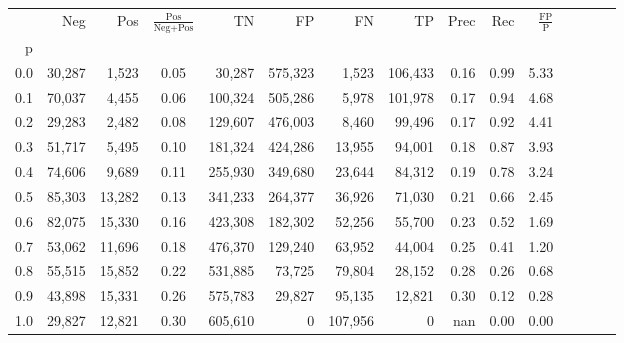 \begin{tabular}{rrrcrrrrrrrrrrr}
\toprule
{} &     Neg &     Pos & $\frac{\text{Pos}}{\text{Neg}+\text{Pos}}$ &       TN &       FP &       FN &       TP &  Prec &   Rec & $\frac{\text{FP}}{\text{P}}$ \\
p   &         &         &                                            &          &          &          &          &       &       &                              \\
\midrule
0.0 &  30,287 &   1,523 &                                       0.05 &   30,287 &  575,323 &    1,523 &  106,433 &  0.16 &  0.99 &                         5.33 \\
0.1 &  70,037 &   4,455 &                                       0.06 &  100,324 &  505,286 &    5,978 &  101,978 &  0.17 &  0.94 &                         4.68 \\
0.2 &  29,283 &   2,482 &                                       0.08 &  129,607 &  476,003 &    8,460 &   99,496 &  0.17 &  0.92 &                         4.41 \\
0.3 &  51,717 &   5,495 &                                       0.10 &  181,324 &  424,286 &   13,955 &   94,001 &  0.18 &  0.87 &                         3.93 \\
0.4 &  74,606 &   9,689 &                                       0.11 &  255,930 &  349,680 &   23,644 &   84,312 &  0.19 &  0.78 &                         3.24 \\
0.5 &  85,303 &  13,282 &                                       0.13 &  341,233 &  264,377 &   36,926 &   71,030 &  0.21 &  0.66 &                         2.45 \\
0.6 &  82,075 &  15,330 &                                       0.16 &  423,308 &  182,302 &   52,256 &   55,700 &  0.23 &  0.52 &                         1.69 \\
0.7 &  53,062 &  11,696 &                                       0.18 &  476,370 &  129,240 &   63,952 &   44,004 &  0.25 &  0.41 &                         1.20 \\
0.8 &  55,515 &  15,852 &                                       0.22 &  531,885 &   73,725 &   79,804 &   28,152 &  0.28 &  0.26 &                         0.68 \\
0.9 &  43,898 &  15,331 &                                       0.26 &  575,783 &   29,827 &   95,135 &   12,821 &  0.30 &  0.12 &                         0.28 \\
1.0 &  29,827 &  12,821 &                                       0.30 &  605,610 &        0 &  107,956 &        0 &   nan &  0.00 &                         0.00 \\
\bottomrule
\end{tabular}
